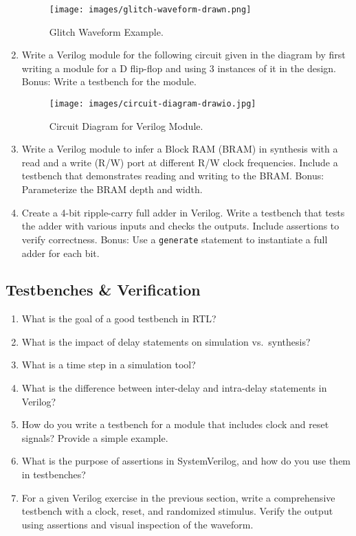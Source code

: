 \documentclass[11pt]{article}
\begin{document}
\begin{enumerate}
    \begin{figure}[H]
        \centering
        \texttt{[image: images/glitch-waveform-drawn.png]}
        \caption{Glitch Waveform Example.}
        \label{fig:glitch_waveform}
    \end{figure}

    \item Write a Verilog module for the following circuit given in the diagram
    by first writing a module for a D flip-flop and using 3 instances of it in
    the design. Bonus: Write a testbench for the module.
    \begin{figure}[H]
        \centering
        \texttt{[image: images/circuit-diagram-drawio.jpg]}
        \caption{Circuit Diagram for Verilog Module.}
        \label{fig:verilog_circuit}
    \end{figure}

    \item Write a Verilog module to infer a Block RAM (BRAM) in synthesis with
    a read and a write (R/W) port at different R/W clock frequencies. Include a
    testbench that demonstrates reading and writing to the BRAM. Bonus:
    Parameterize the BRAM depth and width.

    \item Create a 4-bit ripple-carry full adder in Verilog. Write a testbench that
    tests the adder with various inputs and checks the outputs. Include
    assertions to verify correctness. Bonus: Use a \texttt{generate} statement to
    instantiate a full adder for each bit.
\end{enumerate}

\subsection{Testbenches \& Verification}
\begin{enumerate}
    \item What is the goal of a good testbench in RTL?
    \item What is the impact of delay statements on simulation vs.\ synthesis?
    \item What is a time step in a simulation tool?
    \item What is the difference between inter-delay and intra-delay statements
    in Verilog?
    \item How do you write a testbench for a module that includes clock and
    reset signals? Provide a simple example.
    \item What is the purpose of assertions in SystemVerilog, and how do you
    use them in testbenches?
    \item For a given Verilog exercise in the previous section, write a
    comprehensive testbench with a clock, reset, and randomized stimulus.
    Verify the output using assertions and visual inspection of the waveform.
\end{enumerate}
\end{document}
